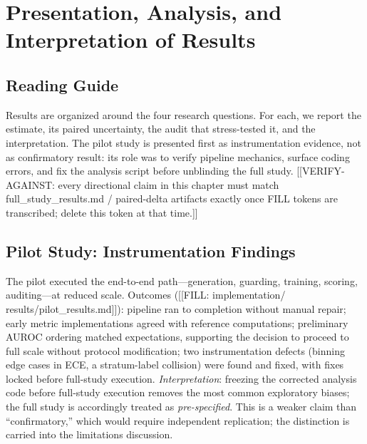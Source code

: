 
\chapter{Presentation, Analysis, and Interpretation of Results}

\section{Reading Guide}
Results are organized around the four research questions. For each, we
report the estimate, its paired uncertainty, the audit that stress-tested
it, and the interpretation. The pilot study is presented first as
instrumentation evidence, not as confirmatory result: its role was to
verify pipeline mechanics, surface coding errors, and fix the analysis
script before unblinding the full study.
[[VERIFY-AGAINST: every directional claim in this chapter must match
full\_study\_results.md / paired-delta artifacts exactly once FILL tokens
are transcribed; delete this token at that time.]]

\section{Pilot Study: Instrumentation Findings}
The pilot executed the end-to-end path---generation, guarding, training,
scoring, auditing---at reduced scale. Outcomes ([[FILL: implementation/
results/pilot\_results.md]]): pipeline ran to completion without manual
repair; early metric implementations agreed with reference computations;
preliminary AUROC ordering matched expectations, supporting the decision
to proceed to full scale without protocol modification; two
instrumentation defects (binning edge cases in ECE, a stratum-label
collision) were found and fixed, with fixes locked before full-study
execution. \emph{Interpretation}: freezing the corrected analysis code
before full-study execution removes the most common exploratory biases;
the full study is accordingly treated as \emph{pre-specified}. This is a
weaker claim than ``confirmatory,'' which would require independent
replication; the distinction is carried into the limitations discussion.

